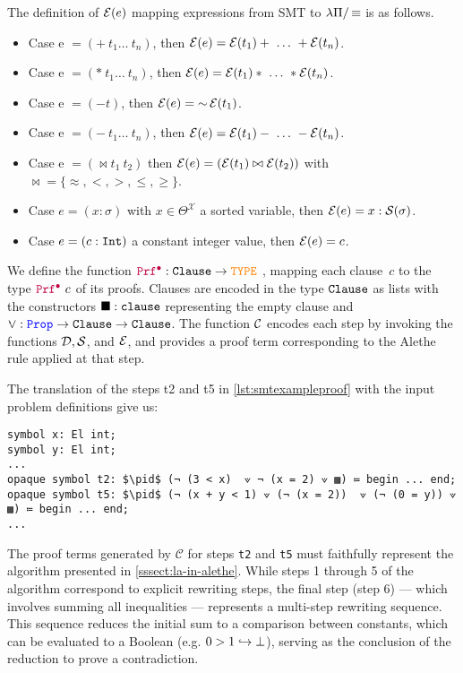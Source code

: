 \begin{definition}%
  The definition of $\E{e}$ mapping expressions from SMT to $\lpm$ is as follows.
  \begin{itemize}
  \setlength{\parskip}{0pt}
  \item Case e $= (+~t_1\dots~t_n)$, then $\E{e} = \E{t_1} + ~\dots~ +\E{t_n}$.
  \item Case e $= (*~t_1\dots~t_n)$, then $\E{e} = \E{t_1} * ~\dots~ *\E{t_n}$.
  \item Case e $= (-t)$, then $\E{e} = \mathop{\sim} \E{t_1}$.
  \item Case e $= (-~t_1\dots~t_n)$, then $\E{e} = \E{t_1} - ~\dots~ - \E{t_n}$.
  \item Case e $= (\mathop{\bowtie} t_1~t_2)$ then $\E{e} = (\E{t_1} \bowtie \E{t_2})$ with $\mathop{\bowtie} = \{\approx, <,>,\leq,\geq \}$.
  \item Case $e = (x: \sigma )$ with $x \in \Theta^\mathcal{X}$ a sorted variable, then $\E{e} = x: \cal{S}(\sigma)$.
  \item Case $e = (c: \mathit{\tt{Int}})$  a constant integer value, then $\E{e} = c$.
  \end{itemize}
\end{definition}
We define the function $\pid: \tt{Clause} \ra \type$ \cite[\S 3]{ColtellacciMD24}, mapping each clause~$c$ to the type $\pid~c$ of its proofs.
Clauses are encoded in the type $\tt{Clause}$%
as lists with the constructors $\nil: \tt{clause}$ representing the empty clause and $\veedot: \prop \ra \tt{Clause} \ra \tt{Clause}$.
The function $\cal{C}$ encodes each step by invoking the functions $\cal{D},\cal{S}$, and $\cal{E}$, and provides a proof term corresponding to the Alethe rule applied at that step.

\begin{example}
The translation of the steps t2 and t5 in \cref{lst:smtexampleproof} with the input problem definitions give us:
\begin{lstlisting}[language=Lambdapi,mathescape=true]
symbol x: El int;
symbol y: El int;
...
opaque symbol t2: $\pid$ (¬ (3 < x)  ⟇ ¬ (x = 2) ⟇ ▩) ≔ begin ... end;
opaque symbol t5: $\pid$ (¬ (x + y < 1) ⟇ (¬ (x = 2))  ⟇ (¬ (0 = y)) ⟇ ▩) ≔ begin ... end;
...
\end{lstlisting}
\end{example}

The proof terms generated by $\mathcal{C}$ for steps \texttt{t2} and \texttt{t5} must faithfully represent the algorithm presented in \cref{sssect:la-in-alethe}.
While steps 1 through 5 of the algorithm correspond to explicit rewriting steps, the final step (step 6) — which involves summing all inequalities — represents a multi-step rewriting sequence.
This sequence reduces the initial sum to a comparison between constants, which can be evaluated to a Boolean (e.g. $0 > 1 \re \bot$), serving as the conclusion of the reduction to prove a contradiction.


